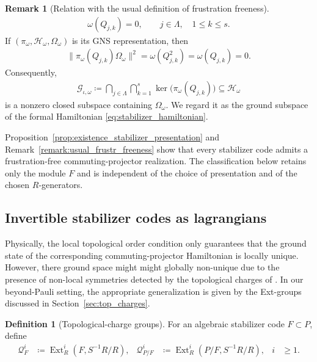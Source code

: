 \documentclass[sn-mathphys-num]{sn-jnl}
\theoremstyle{definition}
\newtheorem{definition}[lemma]{Definition}
\newtheorem{remark}[lemma]{Remark}
\numberwithin{equation}{section}
\theoremstyle{definition}
\def\CG {{\mathcal G}}
\def\CQ {{\mathcal Q}}
\def\La{{\Lambda}}
\def\ker{\operatorname{ker}}
\def\ext{\operatorname{Ext}}
\begin{document}
\begin{remark}[Relation with the usual definition of frustration freeness]
\begin{align}
    \omega(Q_{j,k})=0,
    \qquad j\in\La,
    \quad 1\leqslant k\leqslant s.
\end{align}
If $(\pi_{\omega},\mathcal H_{\omega},\Omega_{\omega})$ is its GNS
representation, then
\begin{align}
    \|\pi_{\omega}(Q_{j,k})\Omega_{\omega}\|^2
    =\omega(Q_{j,k}^2)
    =\omega(Q_{j,k})
    =0.
\end{align}
Consequently,
\begin{align}
    \CG_{\iota,\omega}
    \coloneqq
    \bigcap_{j\in\La}\bigcap_{k=1}^{s}
    \ker\bigl(\pi_{\omega}(Q_{j,k})\bigr)
    \subseteq\mathcal H_{\omega}
\end{align}
is a nonzero closed subspace containing $\Omega_{\omega}$. We regard it as
the ground subspace of the formal Hamiltonian \eqref{eq:stabilizer_hamiltonian}.
\end{remark}

Proposition~\ref{prop:existence_stabilizer_presentation} and
Remark~\ref{remark:usual_frustr_freeness} show that every stabilizer code
admits a frustration-free commuting-projector realization. The
classification below retains only the module $F$ and is independent of the
choice of presentation and of the chosen $R$-generators.

\subsection{Invertible stabilizer codes as lagrangians}
\label{sec:codes/lagrangians}

Physically, the local topological order condition only guarantees that the ground state of the corresponding commuting-projector Hamiltonian is locally unique. However, there ground space might might globally non-unique due to the presence of non-local symmetries detected by the topological charges of \cite{bombin2014structure,haah2013,haah2021classification,ruba2024homological}. In our beyond-Pauli setting, the appropriate generalization is given by the Ext-groups discussed in Section~\ref{sec:top_charges}.

\begin{definition}[Topological-charge groups]
\label{def:stabilizer_topological_charges}
For an algebraic stabilizer code $F\subset P$, define
\begin{align}\label{eq:top_charges}
    \CQ_F^i&\coloneqq\ext_R^i(F,S^{-1}R/R),
    &
    \CQ_{P/F}^i&\coloneqq\ext_R^i(P/F,S^{-1}R/R),
    & i&\geqslant1.
\end{align}
\end{definition}
\end{document}
